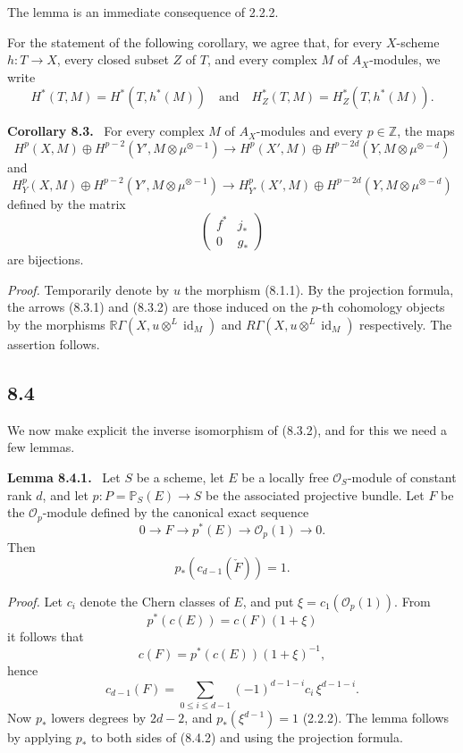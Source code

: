 \documentclass[11pt]{article}
\newenvironment{statement}[1]{\par\medskip\noindent\textbf{#1.}\ }{\par\medskip}
\begin{document}
The lemma is an immediate consequence of 2.2.2.

For the statement of the following corollary, we agree that, for every $X$-scheme $h:T\to X$, every closed subset $Z$ of $T$, and every complex $M$ of $A_X$-modules, we write
\[
H^*(T,M)=H^*(T,h^*(M))
\quad\text{and}\quad
H^*_Z(T,M)=H^*_Z(T,h^*(M)).
\]

\begin{statement}{Corollary 8.3}
For every complex $M$ of $A_X$-modules and every $p\in\mathbb Z$, the maps
\[
H^p(X,M)\oplus H^{p-2}(Y',M\otimes\mu^{\otimes -1})
\to
H^p(X',M)\oplus H^{p-2d}(Y,M\otimes\mu^{\otimes -d})
\tag{8.3.1}
\]
and
\[
H_Y^p(X,M)\oplus H^{p-2}(Y',M\otimes\mu^{\otimes -1})
\to
H_{Y'}^p(X',M)\oplus H^{p-2d}(Y,M\otimes\mu^{\otimes -d})
\tag{8.3.2}
\]
defined by the matrix
\[
\begin{pmatrix}
f^*&j_*\\
0&g_*
\end{pmatrix}
\]
are bijections.
\end{statement}

\emph{Proof.} Temporarily denote by $u$ the morphism (8.1.1). By the projection formula, the arrows (8.3.1) and (8.3.2) are those induced on the $p$-th cohomology objects by the morphisms $\mathbb{R}\Gamma(X,u\otimes^L\operatorname{id}_M)$ and $R\Gamma(X,u\otimes^L\operatorname{id}_M)$ respectively. The assertion follows.

\subsection*{8.4}

We now make explicit the inverse isomorphism of (8.3.2), and for this we need a few lemmas.

\begin{statement}{Lemma 8.4.1}
Let $S$ be a scheme, let $E$ be a locally free $\mathcal O_S$-module of constant rank $d$, and let $p:P=\mathbb P_S(E)\to S$ be the associated projective bundle. Let $F$ be the $\mathcal O_p$-module defined by the canonical exact sequence
\[
0\to F\to p^*(E)\to\mathcal O_p(1)\to0.
\]
Then
\[
p_*(c_{d-1}(\check F))=1.
\]
\end{statement}

\emph{Proof.} Let $c_i$ denote the Chern classes of $E$, and put $\xi=c_1(\mathcal O_p(1))$. From
\[
p^*(c(E))=c(F)(1+\xi)
\]
it follows that
\[
c(F)=p^*(c(E))(1+\xi)^{-1},
\]
hence
\[
c_{d-1}(F)=\sum_{0\le i\le d-1}(-1)^{d-1-i}c_i\,\xi^{d-1-i}.
\tag{8.4.2}
\]
Now $p_*$ lowers degrees by $2d-2$, and $p_*(\xi^{d-1})=1$ (2.2.2). The lemma follows by applying $p_*$ to both sides of (8.4.2) and using the projection formula.
\end{document}
